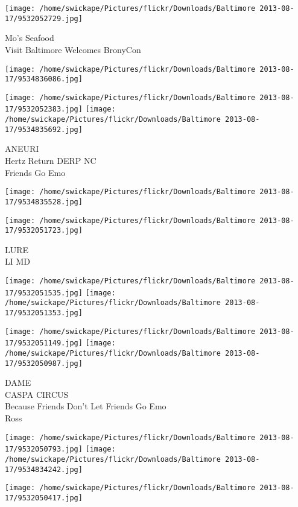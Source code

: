 \documentclass[10pt,letterpaper]{article}
\begin{document}
\vspace{0.25in}
\texttt{[image: /home/swickape/Pictures/flickr/Downloads/Baltimore 2013-08-17/9532052729.jpg]}

Mo's Seafood\\
Visit Baltimore Welcomes BronyCon
\pagebreak

\texttt{[image: /home/swickape/Pictures/flickr/Downloads/Baltimore 2013-08-17/9534836086.jpg]}

\vspace{0.25in}
\texttt{[image: /home/swickape/Pictures/flickr/Downloads/Baltimore 2013-08-17/9532052383.jpg]}
\texttt{[image: /home/swickape/Pictures/flickr/Downloads/Baltimore 2013-08-17/9534835692.jpg]}

ANEURI\\
Hertz Return DERP NC\\
Friends Go Emo
\pagebreak

\texttt{[image: /home/swickape/Pictures/flickr/Downloads/Baltimore 2013-08-17/9534835528.jpg]}

\vspace{0.25in}
\texttt{[image: /home/swickape/Pictures/flickr/Downloads/Baltimore 2013-08-17/9532051723.jpg]}

LURE\\
LI MD
\pagebreak

\texttt{[image: /home/swickape/Pictures/flickr/Downloads/Baltimore 2013-08-17/9532051535.jpg]}
\texttt{[image: /home/swickape/Pictures/flickr/Downloads/Baltimore 2013-08-17/9532051353.jpg]}

\texttt{[image: /home/swickape/Pictures/flickr/Downloads/Baltimore 2013-08-17/9532051149.jpg]}
\texttt{[image: /home/swickape/Pictures/flickr/Downloads/Baltimore 2013-08-17/9532050987.jpg]}

DAME\\
CASPA CIRCUS\\
Because Friends Don't Let Friends Go Emo\\
Ross
\pagebreak

\texttt{[image: /home/swickape/Pictures/flickr/Downloads/Baltimore 2013-08-17/9532050793.jpg]}
\texttt{[image: /home/swickape/Pictures/flickr/Downloads/Baltimore 2013-08-17/9534834242.jpg]}

\vspace{0.25in}
\texttt{[image: /home/swickape/Pictures/flickr/Downloads/Baltimore 2013-08-17/9532050417.jpg]}
\end{document}
